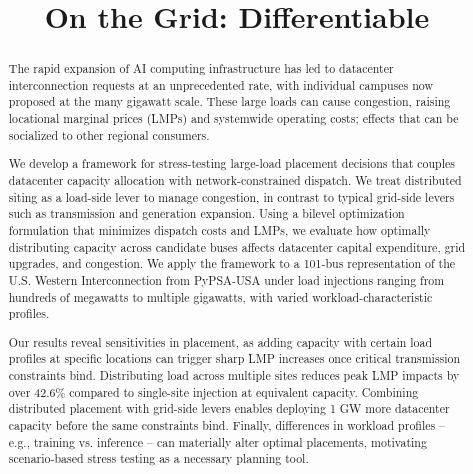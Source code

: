 \documentclass[sigconf, anonymous]{acmart}
\begin{document}
\title{On the Grid: Differentiable }





\renewcommand{\shortauthors}{Anonymous et al.}

\begin{abstract}

The rapid expansion of AI computing infrastructure has led to datacenter interconnection requests at an unprecedented rate, with individual campuses now proposed at the many gigawatt scale. These large loads can cause congestion, raising locational marginal prices (LMPs) and systemwide operating costs; effects that can be socialized to other regional consumers.

We develop a framework for stress-testing large-load placement decisions that couples datacenter capacity allocation with network-constrained dispatch. We treat distributed siting as a load-side lever to manage congestion, in contrast to typical grid-side levers such as transmission and generation expansion. Using a bilevel optimization formulation that minimizes dispatch costs and LMPs, we evaluate how optimally distributing capacity across candidate buses affects datacenter capital expenditure, grid upgrades, and congestion. We apply the framework to a 101-bus representation of the U.S. Western Interconnection from PyPSA-USA under load injections ranging from hundreds of megawatts to multiple gigawatts, with varied workload-characteristic profiles.

Our results reveal sensitivities in placement, as adding capacity with certain load profiles at specific locations can trigger sharp LMP increases once critical transmission constraints bind. Distributing load across multiple sites reduces peak LMP impacts by over 42.6\% compared to single-site injection at equivalent capacity. Combining distributed placement with grid-side levers enables deploying 1 GW more datacenter capacity before the same constraints bind. Finally, differences in workload profiles -- e.g., training vs. inference -- can materially alter optimal placements, motivating scenario-based stress testing as a necessary planning tool.
\end{abstract}
\end{document}
